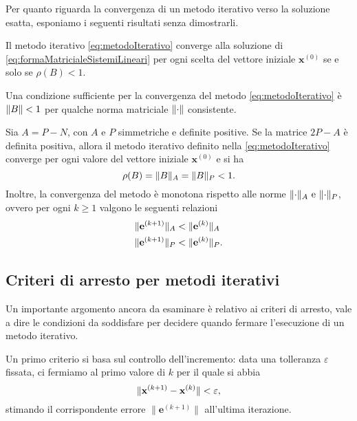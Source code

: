 Per quanto riguarda la convergenza di un metodo iterativo verso la soluzione esatta, esponiamo i seguenti risultati senza dimostrarli.
\begin{teorema}
    Il metodo iterativo \eqref{eq:metodoIterativo} converge alla soluzione di \eqref{eq:formaMatricialeSistemiLineari} per ogni scelta del vettore iniziale
    $\mathbf{x}^{(0)}$ se e solo se $\rho(B)<1$.
\end{teorema}
\begin{corollario}
    \label{cor:condizioneSufficienteConvergenza}
    Una condizione sufficiente per la convergenza del metodo \eqref{eq:metodoIterativo} \`e $\lVert B\rVert<1$ per qualche norma matriciale $\lVert\cdot\rVert$ consistente.
\end{corollario}
\begin{teorema}
    Sia $A = P - N$, con $A$ e $P$ simmetriche e definite positive. Se la matrice $2P - A$ \`e definita positiva, allora il metodo iterativo definito nella \eqref{eq:metodoIterativo} converge per ogni valore del vettore iniziale $\mathbf{x}^{(0)}$ e si ha \[\rho(B) = \lVert B\rVert_{A} = \lVert B\rVert_{P} < 1.\]
    Inoltre, la convergenza del metodo \`e monotona rispetto alle norme $\lVert\cdot\rVert_{A} \ \text{e} \ \lVert\cdot\rVert_{P}$, ovvero per ogni $k \ge 1$ valgono le seguenti relazioni
    \[
    \begin{aligned}
        \lVert\mathbf{e}^{(k+1)}\rVert_{A} &< \lVert\mathbf{e}^{(k)}\rVert_{A} \\
        \lVert\mathbf{e}^{(k+1)}\rVert_{P} &< \lVert\mathbf{e}^{(k)}\rVert_{P}.
    \end{aligned}
    \]
\end{teorema}
\subsection{Criteri di arresto per metodi iterativi}
\label{sec:criteriArresto}
Un importante argomento ancora da esaminare \`e relativo ai criteri di arresto, vale a dire le condizioni da soddisfare per decidere quando fermare l'esecuzione di un
metodo iterativo.

Un primo criterio si basa sul controllo dell'incremento: data una tolleranza $\varepsilon$ fissata, ci fermiamo al primo valore di $k$ per il quale si abbia
\begin{equation*}
    \lVert\mathbf{x}^{(k+1)} - \mathbf{x}^{(k)}\rVert<\varepsilon,
\end{equation*}
stimando il corrispondente errore $\|\mathbf{e}^{(k+1)}\|$ all'ultima iterazione.

